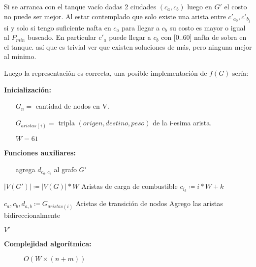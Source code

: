 \documentclass[12pt]{article}
\def\is{\coloneqq}
\begin{document}
Si se arranca con el tanque vacío dadas 2 ciudades $(c_a, c_b)$ luego en $G'$ el costo no puede ser mejor. Al estar contemplado que solo existe una arista entre $c'_{a_0}, c'_{b_j}$ si y solo si tengo suficiente nafta en $c_a$ para llegar a $c_b$ su costo es mayor o igual al $P_{min}$ buscado. En particular $c'_a$ puede llegar a $c_b$ con [0..60] nafta de sobra en el tanque. así que es trivial ver que existen soluciones de más, pero ninguna mejor al minimo. 

Luego la representación es correcta, una posible implementación de $f(G)$ sería:

\begin{algorithm}[H]
	\caption{$f(G)$}
	\begin{algorithmic}[1]
		\item[\textbf{Inicialización:}]
		\item[] \begin{itemize}
			\item[] $G_n = $ cantidad de nodos en V.
			\item[] $G_{aristas(i)} = $ tripla $(origen, destino, peso)$ de la i-esima arista.
			\item[] $W = 61$
		\end{itemize}
		\item[\textbf{Funciones auxiliares:}]
		\item[] \begin{itemize}
			\item[]  agrega $d_{c_a,c_b}$ al grafo $G'$
		\end{itemize}
		\Statex
		\State $|V(G')| \is |V(G)| * W$
		\Comment Aristas de carga de combustible
		\State $c_{i_k} \is i * W + k$
		\State {}
		\EndFor
		\EndFor
		\State
		
		\State $c_a,c_b,d_{a,b} \is G_{aristas(i)}$
		\Comment Aristas de transición de nodos
		\Comment Agrego las aristas bidireccionalmente
		\State {}
		\State {}
		\EndIf
		\EndFor
		\EndFor
		
		\State \Return $V'$
		\EndFunction
	\end{algorithmic}
	\begin{description}
		\item[\textbf{Complejidad algorítmica:}] $O(W \times (n + m))$
	\end{description}
\end{algorithm}
\end{document}

